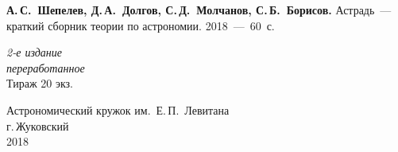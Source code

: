 \setcounter{page}{1}
\thispagestyle{empty}
\vspace*{1cm}
{\hspace{1pc} {\bfseries А.\,С.~Шепелев, Д.\,А.~Долгов, С.\,Д.~Молчанов, С.\,Б.~Борисов.} Астрадь~--- краткий сборник теории по астрономии. 2018~---~60~с.}
\vskip4cm
\begin{center}
	{\slshape 2-е издание\\
	переработанное}\\[5mm]
	\small  Тираж 20 экз.
\end{center}
\vskip6cm
\begin{center}
Астрономический кружок им.~Е.\,П.~Левитана\\[3mm]
г.\,Жуковский\\[1cm]
	2018
\end{center}
\newpage